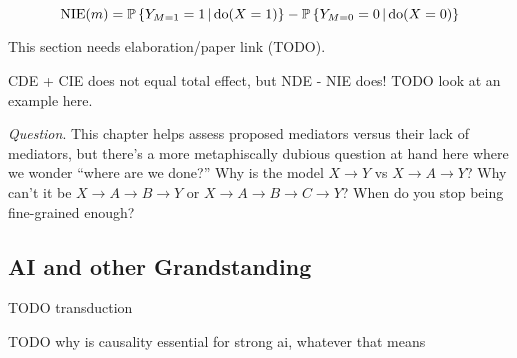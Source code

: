 \documentclass{article}
\begin{document}
$$
  \mathrm{NIE}(m)=\operatorname{\mathbb{P}}\left\{ Y_{M=1}=1 \,\middle|\, \mathrm{do}(X=1) \right\} -\operatorname{\mathbb{P}}\left\{ Y_{M=0}=0 \,\middle|\, \mathrm{do}(X=0) \right\}
$$

This section needs elaboration/paper link (TODO).

CDE + CIE does not equal total effect, but NDE - NIE does! TODO look at an example here.


\textit{Question}. This chapter helps assess proposed mediators versus their lack of mediators, but there's a more metaphiscally dubious question at hand here where we wonder ``where are we done?'' Why is the model $X\rightarrow Y$ vs $X\rightarrow A \rightarrow Y$? Why can't it be $X\rightarrow A \rightarrow B\rightarrow Y$ or $X\rightarrow A \rightarrow B\rightarrow C\rightarrow Y$? When do you stop being fine-grained enough?

\subsection{AI and other Grandstanding}

TODO transduction

TODO why is causality essential for strong ai, whatever that means
\end{document}
